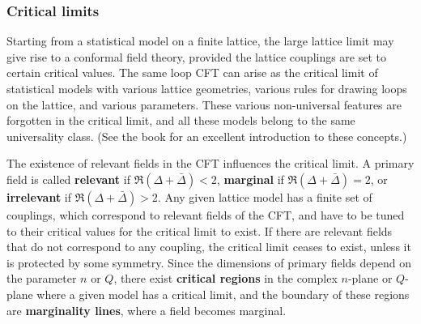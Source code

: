 \documentclass[12pt, a4paper]{article}
\newcommand{\myindex}[1]{\textbf{\boldmath #1}}
\theoremstyle{break}
\begin{document}
\subsubsection{Critical limits}

Starting from a statistical model on a finite lattice, the large lattice limit may give rise to a conformal field theory, provided the lattice couplings are set to certain critical values. The same loop CFT can arise as the critical limit of statistical models with various lattice geometries, various rules for drawing loops on the lattice, and various parameters. These various non-universal features are forgotten in the critical limit, and all these models belong to the same universality class. (See the book \cite{car96} for an excellent introduction to these concepts.) 

The existence of relevant fields in the CFT influences the critical limit. A primary field is called \myindex{relevant} if $\Re(\Delta+\bar\Delta)<2$, \myindex{marginal} if $\Re(\Delta+\bar\Delta)=2$, or \myindex{irrelevant} if $\Re(\Delta+\bar\Delta)>2$. 
Any given lattice model has a finite set of couplings, which correspond to relevant fields of the CFT, and have to be tuned to their critical values for the critical limit to exist. If there are relevant fields that do not correspond to any coupling, the critical limit ceases to exist, unless it is protected by some symmetry. Since the 
dimensions of primary fields depend on the parameter $n$ or $Q$, there exist \myindex{critical regions} in the complex $n$-plane or $Q$-plane where a given model has a critical limit, and the boundary of these regions are \myindex{marginality lines}, where a field becomes marginal. 
\end{document}
